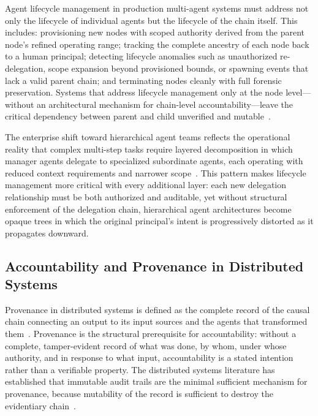 Agent lifecycle management in production multi-agent systems must address not only the lifecycle of individual agents but the lifecycle of the chain itself. This includes: provisioning new nodes with scoped authority derived from the parent node's refined operating range; tracking the complete ancestry of each node back to a human principal; detecting lifecycle anomalies such as unauthorized re-delegation, scope expansion beyond provisioned bounds, or spawning events that lack a valid parent chain; and terminating nodes cleanly with full forensic preservation. Systems that address lifecycle management only at the node level---without an architectural mechanism for chain-level accountability---leave the critical dependency between parent and child unverified and mutable~\cite{multi_agent_coordination_strategies}.

The enterprise shift toward hierarchical agent teams reflects the operational reality that complex multi-step tasks require layered decomposition in which manager agents delegate to specialized subordinate agents, each operating with reduced context requirements and narrower scope~\cite{ibm_hierarchical_agent_hierarchies}. This pattern makes lifecycle management more critical with every additional layer: each new delegation relationship must be both authorized and auditable, yet without structural enforcement of the delegation chain, hierarchical agent architectures become opaque trees in which the original principal's intent is progressively distorted as it propagates downward.

\subsection{Accountability and Provenance in Distributed Systems}
\label{sec:rs-accountability}

Provenance in distributed systems is defined as the complete record of the causal chain connecting an output to its input sources and the agents that transformed them~\cite{immutable_audit_trails_blockchain}. Provenance is the structural prerequisite for accountability: without a complete, tamper-evident record of what was done, by whom, under whose authority, and in response to what input, accountability is a stated intention rather than a verifiable property. The distributed systems literature has established that immutable audit trails are the minimal sufficient mechanism for provenance, because mutability of the record is sufficient to destroy the evidentiary chain~\cite{blockchain_ai_governance}.

